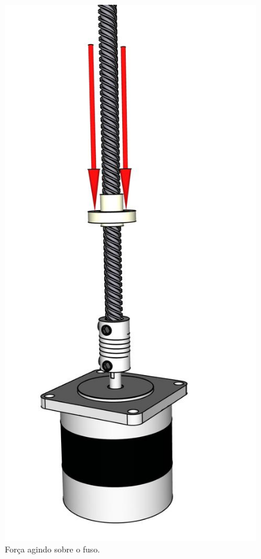 \begin{figure}[H]
\centering
\caption{Força agindo sobre o fuso.}\label{fig:esqforcafuso}
\includegraphics[scale = 0.25]{figuras/esqforcafuso}
\end{figure}
    
